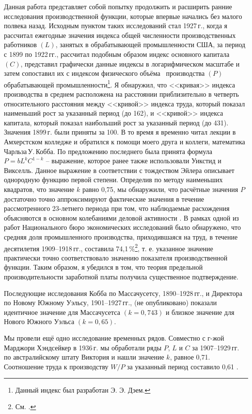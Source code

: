 \documentclass{article}
\begin{document}
Данная работа представляет собой попытку продолжить и расширить ранние исследования производственной функции, которые впервые начались без малого полвека назад. Исходным пунктом таких исследований стал 1927\,г., когда я рассчитал ежегодные значения индекса общей численности производственных работников \((L)\), занятых в обрабатывающей промышленности США, за период с 1899 по 1922\,гг., рассчитал подобным образом индекс основного капитала \((C)\), представил графически данные индексы в логарифмическом масштабе и затем сопоставил их с индексом физического объёма~%
производства \((P)\) обрабатывающей промышленности\footnote{Данный индекс был разработан Э. Э. Дэем.}. Я обнаружил, что <<кривая>> индекса производства в среднем расположена на расстоянии приблизительно в четверть относительного расстояния между <<кривой>> индекса труда, который показал наименьший рост за указанный период (до 162), и <<кривой>> индекса капитала, который показал наибольший рост за указанный период (до 431). Значения 1899\,г. были приняты за 100. В то время я временно читал лекции в Амхерстском колледже и обратился к помощи моего друга и коллеги, математика Чарльза\,У.\,Кобба. По предложению последнего была принята формула \(P=bL^kC^{1-k}\) -- выражение, которое ранее также использовали Уикстид и Викселль. Данное выражение в соответствии с тождеством Эйлера описывает однородную функцию первой степени. Определив по методу наименьших квадратов, что значение \(k\) равно 0,75, мы обнаружили, что расчётные значения \(P\) достаточно точно аппроксимируют фактические значения в течение рассмотренного 23-летнего периода при том, что наблюдаемые расхождения объясняются в основном колебаниями деловой активности \cite[сс.\,139--65]{Douglas:1}. В рамках одной из работ Национального бюро экономических исследований было обнаружено, что средняя доля промышленного производства, приходившаяся на труд, в течение десятилетия 1909--1918\,гг., составила 74,1\,\%\footnote{См. \cite[с.\,98]{Mitchell:1}.}, т. е. указанное значение практически точно соответствовало значению показателя производственной функции. Таким образом, я убедился в том, что теория предельной производительности заработной платы получила существенное подтверждение.

Последующие исследования Кобба по Массачусетсу, 1890--1928\,гг., \cite{Cobb:1} и Директора по Новому Южному Уэльсу, 1901--1927\,гг., (не опубликовано) показали идентичное значение для Массачусетса \((k = 0{,}743)\) и близкое значение для Нового Южного Уэльса \((k = 0{,}65)\).

Мы провели ещё одно исследование временных рядов. Совместно с г\mbox{-}жой Марджори Хэндсейкер в 1936\,г. мы обработали ряды \(P\), \(L\) и \(C\) за 1907--1929\,гг. по австралийскому штату Виктория и нашли значение \(k\), равное 0,71. Соотношение труда к производству \(W/P\) за указанный период составило 0,61 \cite{Douglas:6}.
\end{document}

